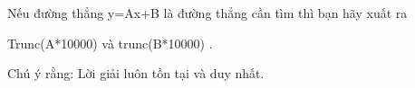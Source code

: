 Nếu đường thẳng y=Ax+B là đường thẳng cần tìm thì bạn hãy xuất ra  

   Trunc(A*10000) và trunc(B*10000) .  

       Chú ý rằng: Lời giải luôn tồn tại và duy nhất.     

\